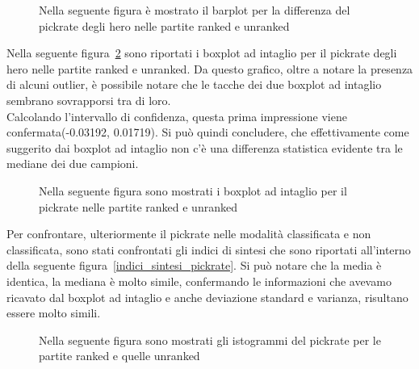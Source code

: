 \begin{figure}[htbp]
\begin{center}
\hspace*{-0.15\linewidth}

\caption{Nella seguente figura è mostrato il barplot per la differenza del pickrate degli hero nelle partite ranked e unranked}
\label{differenza_distribuzione_pickrate}
\end{center}
\end{figure}
Nella seguente figura~\ref{boxplot_pickrate} sono riportati i boxplot ad intaglio per il pickrate degli hero nelle partite ranked e unranked. Da questo grafico, oltre a notare la presenza di alcuni outlier, è possibile notare che le tacche dei due boxplot ad intaglio sembrano sovrapporsi tra di loro. \\
Calcolando l'intervallo di confidenza, questa prima impressione viene confermata(-0.03192,  0.01719).
Si può quindi concludere, che effettivamente come suggerito dai boxplot ad intaglio non c'è una differenza statistica evidente tra le mediane dei due campioni. 
\begin{figure}[htbp]
\begin{center}

\caption{Nella seguente figura sono mostrati i boxplot ad intaglio per il pickrate nelle partite ranked e unranked}
\label{boxplot_pickrate}
\end{center}
\end{figure}
Per confrontare, ulteriormente il pickrate nelle modalità classificata e non classificata, sono stati confrontati gli indici di sintesi che sono riportati all'interno della seguente figura~\ref{indici_sintesi_pickrate}. Si può notare che la media è identica, la mediana è molto simile, confermando le informazioni che avevamo ricavato dal boxplot ad intaglio e anche deviazione standard e varianza, risultano essere molto simili.
\begin{figure}[htbp]
\begin{center}
\hspace*{-0.1\linewidth}

\caption{Nella seguente figura sono mostrati gli istogrammi del pickrate per le partite ranked e quelle unranked}
\label{distribuzione_pick_ranked_unranked}
\end{center}
\end{figure}
